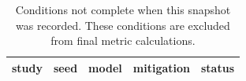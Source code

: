 \begin{table}[htbp!]
\centering
\small
\setlength{\tabcolsep}{3pt}
\renewcommand{\arraystretch}{1.1}
\begin{tabular}{lrlll}
\hline
study & seed & model & mitigation & status \\
\hline
\hline
\end{tabular}
\caption{Conditions not complete when this snapshot was recorded. These conditions are excluded from final metric calculations.}
\label{chap:results:tab:analysis_pending_sources}
\end{table}
